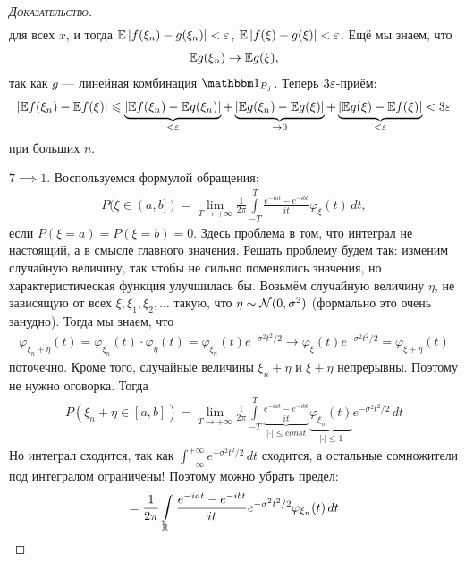 \documentclass[../main.tex]{subfiles}
\begin{document}
\begin{proof}[\normalfont\textsc{Доказательство}]
\begin{align*}
 \end{align*} для всех $ x $, и тогда $ \mathbb E \left| f(\xi_n)-g(\xi_n) \right|< \varepsilon $, $ \mathbb E \left| f(\xi)-g(\xi) \right| < \varepsilon $. Ещё мы знаем, что
 \begin{align*}
  \mathbb E g(\xi_n) \to \mathbb E g(\xi),
 \end{align*} так как $ g $ --- линейная комбинация $ \Ind_{B_j} $. Теперь $ 3\varepsilon $-приём:
 \begin{align*}
  \left| \mathbb E f(\xi_n) - \mathbb E f(\xi) \right| \leqslant \underbrace{\left| \mathbb E f(\xi_n) - \mathbb E g(\xi_n) \right|}_{<\varepsilon} + \underbrace{\left| \mathbb E g(\xi_n) - \mathbb E g(\xi) \right|}_{\to 0} + \underbrace{\left| \mathbb E g(\xi) - \mathbb E f(\xi) \right|}_{< \varepsilon} < 3\varepsilon
 \end{align*} при больших $ n $.

 $ 7 \implies 1 $. Воспользуемся формулой обращения:
 \begin{align*}
  P(\xi \in (a,b]) = \lim_{T \to +\infty}  \frac{1}{2\pi} \int\limits_{-T}^{T} \frac{e^{-iat} - e^{-ibt}}{it} \varphi_\xi(t)\,dt,
 \end{align*} если $ P(\xi = a) = P(\xi = b) = 0 $. Здесь проблема в том, что интеграл не настоящий, а в смысле главного значения. Решать проблему будем так: изменим случайную величину, так чтобы не сильно поменялись значения, но характеристическая функция улучшилась бы. Возьмём случайную величину $ \eta $, не зависящую от всех $ \xi, \xi_1, \xi_2, \ldots $ такую, что $ \eta \sim \mathcal N(0, \sigma^{2}) $ (формально это очень занудно). Тогда мы знаем, что
 \begin{align*}
  \varphi_{\xi_n + \eta}(t) = \varphi_{\xi_n}(t) \cdot \varphi_\eta(t) = \varphi_{\xi_n}(t) e^{-\sigma^{2}t^{2} / 2} \to \varphi_\xi(t) e^{-\sigma^{2}t^{2} / 2} = \varphi_{\xi+\eta}(t)
 \end{align*} поточечно. Кроме того, случайные величины $ \xi_n + \eta $ и   $ \xi + \eta $ непрерывны. Поэтому не нужно оговорка. Тогда
   \begin{align*}
		 P(\xi_n + \eta \in [a,b]) = \lim_{T \to +\infty}  \frac{1}{2\pi} \int\limits_{-T}^T \underbrace{\frac{e^{-iat} - e^{-ibt}}{it}}_{|\cdot| \leqslant const} \underbrace{\varphi_{\xi_n}(t)}_{|\cdot| \leqslant 1} e^{-\sigma^{2}t^{2} / 2} \,dt
	 \end{align*} Но интеграл сходится, так как $\int_{-\infty}^{+\infty} e^{-\sigma^2t^2/2}\,dt$ сходится, а остальные сомножители под интегралом ограничены! Поэтому можно убрать предел:
 \begin{align*}
	 = \frac{1}{2\pi} \int\limits_{\R} \frac{e^{-iat} - e^{-ibt}}{it} e^{-\sigma^{2}t^{2} / 2}\varphi_{\xi_n}(t)\,dt

\end{align*}
\end{proof}
\end{document}
